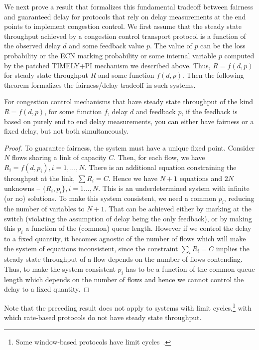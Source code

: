 We next prove a result that formalizes this fundamental tradeoff between fairness
and guaranteed delay for protocols that rely on delay measurements at the end
points to implement congestion control. We first assume that the
steady state throughput achieved by a congestion control transport
protocol is a function of the observed delay $d$ and some feedback
value $p$. The value of $p$ can be the loss probability or the ECN marking
probability or some internal variable $p$ computed by the patched
TIMELY+PI mechanism we described above. Thus,
$R = f(d,p)$ for steady state throughput $R$ and some function $f(d,p)$. Then the
following theorem formalizes the fairness/delay tradeoff in such systems.

\begin{thm}
\label{thm:fairness-delay}
For congestion control mechanisms that have steady state throughput of
the kind $R = f(d,p)$, for some function $f$, delay $d$ and
feedback $p$, if the feedback is based on purely end to end
delay measurements, you can either have fairness or a fixed delay, 
but not both simultaneously.
\end{thm}
\begin{proof}
To guarantee fairness, the system must have a
unique fixed point. 
Consider $N$ flows sharing a link of capacity $C$. 
Then, for each flow, we have 
$ R_i = f(d,p_i), i = 1,\ldots,N.$
There is an additional equation constraining the throughput at the
link, $\sum R_i = C$.
Hence we have $N+1$ equations and $2 N$ unknowns -- $\{R_i,p_i\},
 i=1\ldots,N$. This is an underdetermined system with infinite (or no)
solutions. To make this system consistent, we need a common $p_i$,
reducing the number of variables to $N+1$. That can be achieved
either by marking at the switch (violating the assumption of delay
being the only feedback), or by making this $p_i$ a function of
the (common) queue length. However if we control the delay to a fixed quantity,
it becomes agnostic of the number of flows which will make the system
of equations inconsistent, since the constraint $\sum_i R_i = C$
implies the steady state throughput of a flow depends on the number of
flows contending. Thus, to make the system consistent $p_i$ has to be
a function of the common queue length which depends on the number of flows 
and hence we cannot control the delay to a fixed quantity. 
\end{proof}
Note that the preceding result does not apply to systems with
limit cycles,\footnote{Some window-based protocols have limit cycles~\cite{dctcp-analysis}.} 
with which rate-based protocols do not have steady state throughput.

